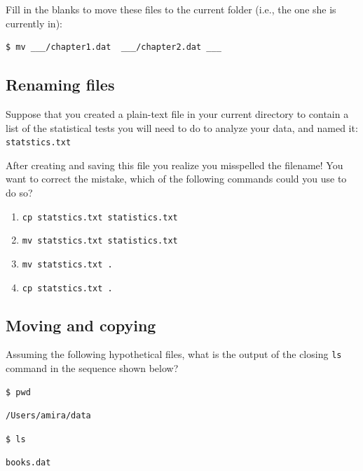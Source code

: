 \documentclass[
]{krantz}
\providecommand{\tightlist}{%
  \setlength{\itemsep}{0pt}\setlength{\parskip}{0pt}}
\begin{document}
Fill in the blanks to move these files to the current folder
(i.e., the one she is currently in):

\begin{verbatim}
$ mv ___/chapter1.dat  ___/chapter2.dat ___
\end{verbatim}

\hypertarget{bash-basics-ex-renaming-files}{%
\subsection{Renaming files}\label{bash-basics-ex-renaming-files}}

Suppose that you created a plain-text file in your current directory to contain a list of the
statistical tests you will need to do to analyze your data, and named it: \texttt{statstics.txt}

After creating and saving this file you realize you misspelled the filename! You want to
correct the mistake, which of the following commands could you use to do so?

\begin{enumerate}
\def\labelenumi{\arabic{enumi}.}
\tightlist
\item
  \texttt{cp\ statstics.txt\ statistics.txt}
\item
  \texttt{mv\ statstics.txt\ statistics.txt}
\item
  \texttt{mv\ statstics.txt\ .}
\item
  \texttt{cp\ statstics.txt\ .}
\end{enumerate}

\hypertarget{bash-basics-ex-last-ls}{%
\subsection{Moving and copying}\label{bash-basics-ex-last-ls}}

Assuming the following hypothetical files,
what is the output of the closing \texttt{ls} command in the sequence shown below?

\begin{verbatim}
$ pwd
\end{verbatim}

\begin{verbatim}
/Users/amira/data
\end{verbatim}

\begin{verbatim}
$ ls
\end{verbatim}

\begin{verbatim}
books.dat
\end{verbatim}
\end{document}
